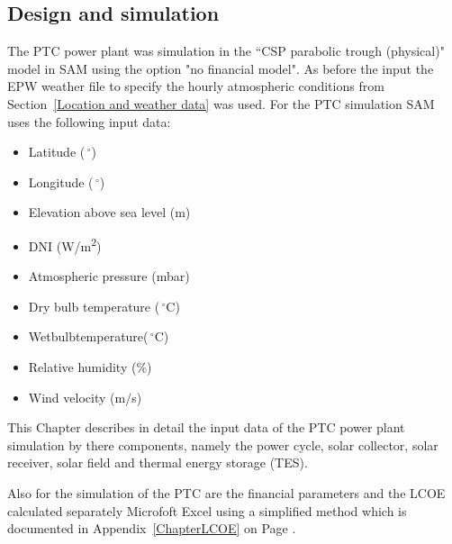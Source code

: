 \subsection{Design  and simulation} \label{PTC power plant design  and simulation}
The PTC power plant was simulation in the “CSP parabolic trough (physical)" model in SAM using the option "no financial model". As before the input the EPW weather file to specify the hourly atmospheric conditions from Section~\ref{Location and weather data} was used. For the PTC simulation SAM uses the following input data:
\begin{itemize}
\item Latitude ($\,^{\circ}$)
\item Longitude ($\,^{\circ}$)
\item Elevation above sea level (m)
\item DNI (W/m\textsuperscript{2})
\item Atmospheric pressure (mbar)
\item Dry bulb temperature ($\,^{\circ}\mathrm{C}$)
\item Wetbulbtemperature($\,^{\circ}\mathrm{C}$)
\item Relative humidity (\%)
\item Wind velocity (m/s)
\end{itemize}
This Chapter describes in detail the input data of the PTC power plant simulation by there components, namely the  power cycle, solar collector, solar receiver, solar field and thermal energy storage (TES).

Also for the simulation of the PTC are the financial parameters and the LCOE calculated separately Microfoft Excel using a simplified method which is documented in Appendix~\ref{ChapterLCOE} on Page \pageref{ChapterLCOE}.
